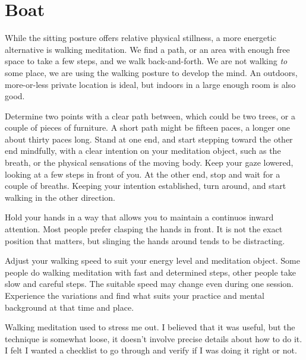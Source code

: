 \chapter{Boat}


While the sitting posture offers relative physical stillness, a more
energetic alternative is walking meditation. We find a path, or an area
with enough free space to take a few steps, and we walk back-and-forth.
We are not walking \emph{to} some place, we are using the walking
posture to develop the mind. An outdoors, more-or-less private location
is ideal, but indoors in a large enough room is also good.

Determine two points with a clear path between, which could be two
trees, or a couple of pieces of furniture. A short path might be fifteen
paces, a longer one about thirty paces long. Stand at one end, and start
stepping toward the other end mindfully, with a clear intention on your
meditation object, such as the breath, or the physical sensations of the
moving body. Keep your gaze lowered, looking at a few steps in front of
you. At the other end, stop and wait for a couple of breaths. Keeping
your intention established, turn around, and start walking in the other
direction.

Hold your hands in a way that allows you to maintain a continuos inward
attention. Most people prefer clasping the hands in front. It is not the
exact position that matters, but slinging the hands around tends to be
distracting.

\clearpage
\thispagestyle{empty}\mbox{}
\clearpage

Adjust your walking speed to suit your energy level and meditation
object. Some people do walking meditation with fast and determined
steps, other people take slow and careful steps. The suitable speed may
change even during one session. Experience the variations and find what
suits your practice and mental background at that time and place.


Walking meditation used to stress me out. I believed that it was useful,
but the technique is somewhat loose, it doesn't involve precise details
about how to do it. I felt I wanted a checklist to go through and verify
if I was doing it right or not.

